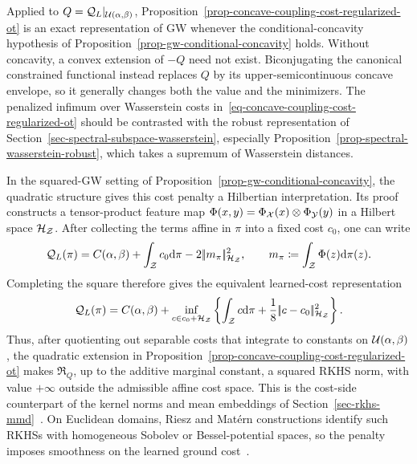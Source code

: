 Applied to $Q=\mathcal Q_L|_{\mathcal{U}(\alpha,\beta)}$, Proposition~\ref{prop-concave-coupling-cost-regularized-ot} is an exact representation of GW whenever the conditional-concavity hypothesis of Proposition~\ref{prop-gw-conditional-concavity} holds. Without concavity, a convex extension of $-Q$ need not exist. Biconjugating the canonical constrained functional instead replaces $Q$ by its upper-semicontinuous concave envelope, so it generally changes both the value and the minimizers. The penalized infimum over Wasserstein costs in~\eqref{eq-concave-coupling-cost-regularized-ot} should be contrasted with the robust representation of Section~\ref{sec-spectral-subspace-wasserstein}, especially Proposition~\ref{prop-spectral-wasserstein-robust}, which takes a supremum of Wasserstein distances.

In the squared-GW setting of Proposition~\ref{prop-gw-conditional-concavity}, the quadratic structure gives this cost penalty a Hilbertian interpretation. Its proof constructs a tensor-product feature map
$\Phi(x,y)=\Phi_{\mathcal{X}}(x)\otimes\Phi_{\mathcal{Y}}(y)$
in a Hilbert space $\mathcal{H}_{\mathcal Z}$. After collecting the terms affine in $\pi$ into a fixed cost $c_0$, one can write
\[
	\mathcal Q_L(\pi)
	=
	C(\alpha,\beta)
	+
	\int_{\mathcal Z}c_0\mathrm{d}\pi
	-
	2|\!| m_\pi |\!|_{\mathcal{H}_{\mathcal Z}}^2,
	\qquad
	m_\pi\coloneqq\int_{\mathcal Z}\Phi(z)\mathrm{d}\pi(z).
\]
Completing the square therefore gives the equivalent learned-cost representation
\begin{equation}\label{eq-gw-rkhs-cost-regularization}
	\mathcal Q_L(\pi)
	=
	C(\alpha,\beta)
	+
	\inf_{c\in c_0+\mathcal{H}_{\mathcal Z}}
	\left\{
		\int_{\mathcal Z}c\mathrm{d}\pi
		+
		\frac18|\!| c-c_0 |\!|_{\mathcal{H}_{\mathcal Z}}^2
	\right\}.
\end{equation}
Thus, after quotienting out separable costs that integrate to constants on $\mathcal{U}(\alpha,\beta)$, the quadratic extension in Proposition~\ref{prop-concave-coupling-cost-regularized-ot} makes $\mathfrak R_Q$, up to the additive marginal constant, a squared RKHS norm, with value $+\infty$ outside the admissible affine cost space. This is the cost-side counterpart of the kernel norms and mean embeddings of Section~\ref{sec-rkhs-mmd}~\cite{berlinet03reproducing,SebbouhCuturiPeyre2024}. On Euclidean domains, Riesz and Mat\'ern constructions identify such RKHSs with homogeneous Sobolev or Bessel-potential spaces, so the penalty imposes smoothness on the learned ground cost~\cite{berg84harmonic,wendland2005scattered}.

